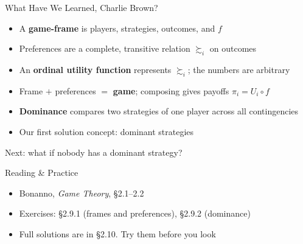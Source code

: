 \begin{frame}{What Have We Learned, Charlie Brown?}
\begin{itemize}
    \item A \textbf{game-frame} is players, strategies, outcomes, and $f$
    \item Preferences are a complete, transitive relation $\succsim_i$ on outcomes
    \item An \textbf{ordinal utility function} represents $\succsim_i$; the numbers are arbitrary
    \item Frame $+$ preferences $=$ \textbf{game}; composing gives payoffs $\pi_i=U_i\circ f$
    \item \textbf{Dominance} compares two strategies of one player across all contingencies
    \item Our first solution concept: dominant strategies
\end{itemize}
\vfill
Next: what if nobody has a dominant strategy?
\vspace{-0.5in}
\end{frame}

\begin{frame}{Reading \& Practice}
\begin{itemize}
    \item Bonanno, \textit{Game Theory}, \S2.1--2.2
    \item Exercises: \S2.9.1 (frames and preferences), \S2.9.2 (dominance)
    \item Full solutions are in \S2.10. Try them before you look
\end{itemize}
\vfill
\end{frame}


